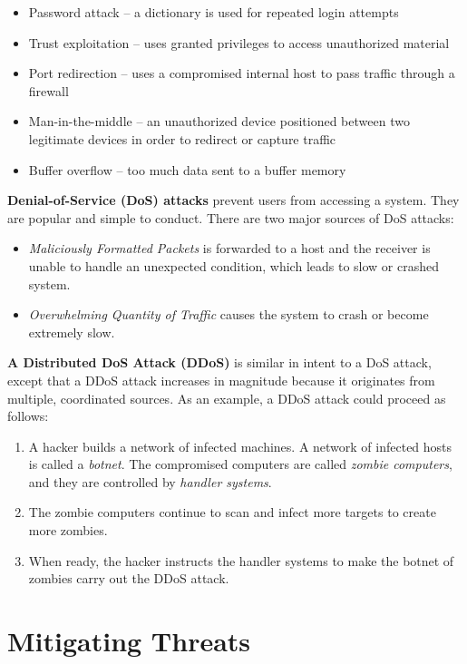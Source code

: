 \begin{itemize}
\item Password attack -- a dictionary is used for repeated login attempts
\item Trust exploitation -- uses granted privileges to access unauthorized material
\item Port redirection -- uses a compromised internal host to pass traffic through a firewall
\item Man-in-the-middle -- an unauthorized device positioned between two legitimate devices in order to redirect or capture traffic
\item Buffer overflow -- too much data sent to a buffer memory
\end{itemize}

\textbf{Denial-of-Service (DoS) attacks} prevent users from accessing a system. They are popular and simple to conduct. There are two major sources of DoS attacks:

\begin{itemize}
\item \emph{Maliciously Formatted Packets} is forwarded to a host and the receiver is unable to handle an unexpected condition, which leads to slow or crashed system.
\item \emph{Overwhelming Quantity of Traffic} causes the system to crash or become extremely slow.
\end{itemize}

\textbf{A Distributed DoS Attack (DDoS)} is similar in intent to a DoS attack, except that a DDoS attack increases in magnitude because it originates from multiple, coordinated sources. As an example, a DDoS attack could proceed as follows:

\begin{enumerate}
\item A hacker builds a network of infected machines. A network of infected hosts is called a \emph{botnet}. The compromised computers are called \emph{zombie computers}, and they are controlled by \emph{handler systems}.
\item The zombie computers continue to scan and infect more targets to create more zombies.
\item When ready, the hacker instructs the handler systems to make the botnet of zombies carry out the DDoS attack.
\end{enumerate}

\section{Mitigating Threats}

